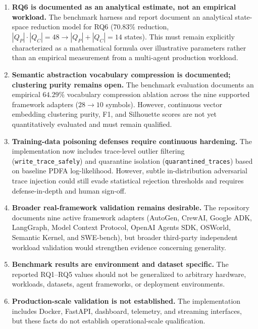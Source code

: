 \documentclass[11pt,a4paper]{article}
\begin{document}
\begin{enumerate}[leftmargin=1.8em, itemsep=0.5em]

\item \textbf{RQ6 is documented as an analytical estimate, not an empirical workload.}
The benchmark harness and report document an analytical state-space reduction model for RQ6
($70.83\%$ reduction, $|Q_P| \cdot |Q_C| = 48 \to |Q_P| + |Q_C| = 14$ states). This must
remain explicitly characterized as a mathematical formula over illustrative parameters
rather than an empirical measurement from a multi-agent production workload.

\item \textbf{Semantic abstraction vocabulary compression is documented; clustering purity remains open.}
The benchmark evaluation documents an empirical $64.29\%$ vocabulary compression ablation
across the nine supported framework adapters ($28 \to 10$ symbols). However, continuous
vector embedding clustering purity, F1, and Silhouette scores are not yet quantitatively
evaluated and must remain qualified.

\item \textbf{Training-data poisoning defenses require continuous hardening.}
The implementation now includes trace-level outlier filtering (\texttt{write\_trace\_safely})
and quarantine isolation (\texttt{quarantined\_traces}) based on baseline PDFA log-likelihood.
However, subtle in-distribution adversarial trace injection could still evade statistical
rejection thresholds and requires defense-in-depth and human sign-off.

\item \textbf{Broader real-framework validation remains desirable.}
The repository documents nine active framework adapters (AutoGen, CrewAI, Google ADK,
LangGraph, Model Context Protocol, OpenAI Agents SDK, OSWorld, Semantic Kernel, and SWE-bench),
but broader third-party independent workload validation would strengthen evidence concerning generality.

\item \textbf{Benchmark results are environment and dataset specific.}
The reported RQ1--RQ5 values should not be generalized to arbitrary hardware, workloads,
datasets, agent frameworks, or deployment environments.

\item \textbf{Production-scale validation is not established.}
The implementation includes Docker, FastAPI, dashboard, telemetry, and streaming
interfaces, but these facts do not establish operational-scale qualification.


\end{enumerate}
\end{document}
